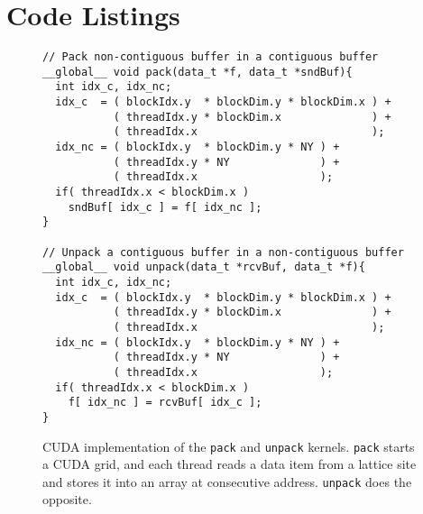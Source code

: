 \documentclass{elsarticle}
\begin{document}

\newpage


\appendix\section{Code Listings}

%
\begin{figure}[h]
\centering
\begin{lstlisting}[basicstyle=\scriptsize]
// Pack non-contiguous buffer in a contiguous buffer
__global__ void pack(data_t *f, data_t *sndBuf){
  int idx_c, idx_nc;  
  idx_c  = ( blockIdx.y  * blockDim.y * blockDim.x ) +  
           ( threadIdx.y * blockDim.x              ) +  
           ( threadIdx.x                           );
  idx_nc = ( blockIdx.y  * blockDim.y * NY ) +  
           ( threadIdx.y * NY              ) +  
           ( threadIdx.x                   );    
  if( threadIdx.x < blockDim.x )
    sndBuf[ idx_c ] = f[ idx_nc ];
}

// Unpack a contiguous buffer in a non-contiguous buffer
__global__ void unpack(data_t *rcvBuf, data_t *f){
  int idx_c, idx_nc;
  idx_c  = ( blockIdx.y  * blockDim.y * blockDim.x ) +
           ( threadIdx.y * blockDim.x              ) +
           ( threadIdx.x                           ); 
  idx_nc = ( blockIdx.y  * blockDim.y * NY ) + 
           ( threadIdx.y * NY              ) + 
           ( threadIdx.x                   );
  if( threadIdx.x < blockDim.x )
    f[ idx_nc ] = rcvBuf[ idx_c ];
}
\end{lstlisting}
\caption{\label{fig:pack-unpack}
CUDA implementation of the {\tt pack} and {\tt unpack} kernels. 
{\tt pack} starts a CUDA grid, 
and each thread reads a data item from a lattice site and stores it into 
an array at consecutive address. {\tt unpack} does the opposite.
}
\end{figure}


\newpage
\end{document}
